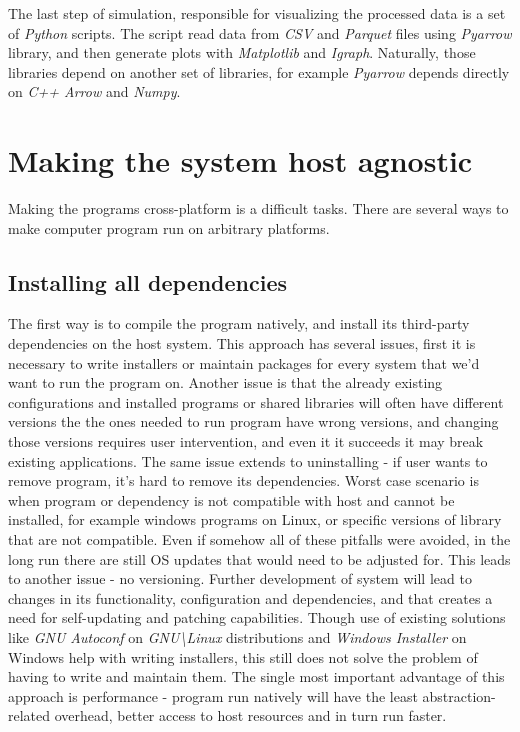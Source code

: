 The last step of simulation, responsible for visualizing the processed data is a set of \textit{Python} scripts. The script read data from \textit{CSV} and \textit{Parquet} files using \textit{Pyarrow} library, and then generate plots with \textit{Matplotlib} and \textit{Igraph}. Naturally, those libraries depend on another set of libraries, for example \textit{Pyarrow} depends directly on \textit{C++ Arrow} and \textit{Numpy}. 
\newpage
\section{Making the system host agnostic}
Making the programs cross-platform is a difficult tasks. There are several ways to make computer program run on arbitrary platforms.
\subsection{Installing all dependencies}
The first way is to compile the program natively, and install its third-party dependencies on the host system. This approach has several issues, first it is necessary to write installers or maintain packages for every system that we'd want to run the program on. Another issue is that the already existing configurations and installed programs or shared libraries will often have different versions the the ones needed to run program have wrong versions, and changing those versions requires user intervention, and even it it succeeds it may break existing applications. The same issue extends to uninstalling - if user wants to remove program, it's hard to remove its dependencies. Worst case scenario is when program or dependency is not compatible with host and cannot be installed, for example windows programs on Linux, or specific versions of library that are not compatible. Even if somehow all of these pitfalls were avoided, in the long run there are still OS updates that would need to be adjusted for. This leads to another issue - no versioning. Further development of system will lead to changes in its functionality, configuration and dependencies, and that creates a need for self-updating and patching capabilities. Though use of existing solutions like \textit{GNU Autoconf} on \textit{GNU\textbackslash Linux} distributions and \textit{Windows Installer} on Windows help with writing installers, this still does not solve the problem of having to write and maintain them.
The single most important advantage of this approach is performance - program run natively will have the least abstraction-related overhead, better access to host resources and in turn run faster. 
